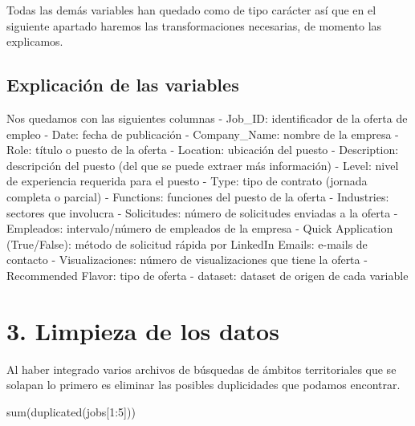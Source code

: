 \documentclass[
]{article}
\newenvironment{Shaded}{\begin{snugshade}}{\end{snugshade}}
\newcommand{\DecValTok}[1]{\textcolor[rgb]{0.86,0.86,0.80}{#1}}
\newcommand{\KeywordTok}[1]{\textcolor[rgb]{0.94,0.87,0.69}{#1}}
\newcommand{\NormalTok}[1]{\textcolor[rgb]{0.80,0.80,0.80}{#1}}
\newcommand{\OperatorTok}[1]{\textcolor[rgb]{0.94,0.94,0.82}{#1}}
\newcommand{\OtherTok}[1]{\textcolor[rgb]{0.94,0.94,0.56}{#1}}
\newcommand{\StringTok}[1]{\textcolor[rgb]{0.80,0.58,0.58}{#1}}
\begin{document}
\begin{Shaded}
\end{Shaded}

Todas las demás variables han quedado como de tipo carácter así que en
el siguiente apartado haremos las transformaciones necesarias, de
momento las explicamos.

\hypertarget{explicaciuxf3n-de-las-variables}{%
\subsection{Explicación de las
variables}\label{explicaciuxf3n-de-las-variables}}

Nos quedamos con las siguientes columnas - Job\_ID: identificador de la
oferta de empleo - Date: fecha de publicación - Company\_Name: nombre de
la empresa - Role: título o puesto de la oferta - Location: ubicación
del puesto - Description: descripción del puesto (del que se puede
extraer más información) - Level: nivel de experiencia requerida para el
puesto - Type: tipo de contrato (jornada completa o parcial) -
Functions: funciones del puesto de la oferta - Industries: sectores que
involucra - Solicitudes: número de solicitudes enviadas a la oferta -
Empleados: intervalo/número de empleados de la empresa - Quick
Application (True/False): método de solicitud rápida por LinkedIn
Emails: e-mails de contacto - Visualizaciones: número de visualizaciones
que tiene la oferta - Recommended Flavor: tipo de oferta - dataset:
dataset de origen de cada variable

\hypertarget{limpieza-de-los-datos}{%
\section{3. Limpieza de los datos}\label{limpieza-de-los-datos}}

Al haber integrado varios archivos de búsquedas de ámbitos territoriales
que se solapan lo primero es eliminar las posibles duplicidades que
podamos encontrar.

\begin{Shaded}
\begin{Highlighting}[]
\KeywordTok{sum}\NormalTok{(}\KeywordTok{duplicated}\NormalTok{(jobs[}\DecValTok{1}\OperatorTok{:}\DecValTok{5}\NormalTok{]))}
\end{Highlighting}
\end{Shaded}
\end{document}
